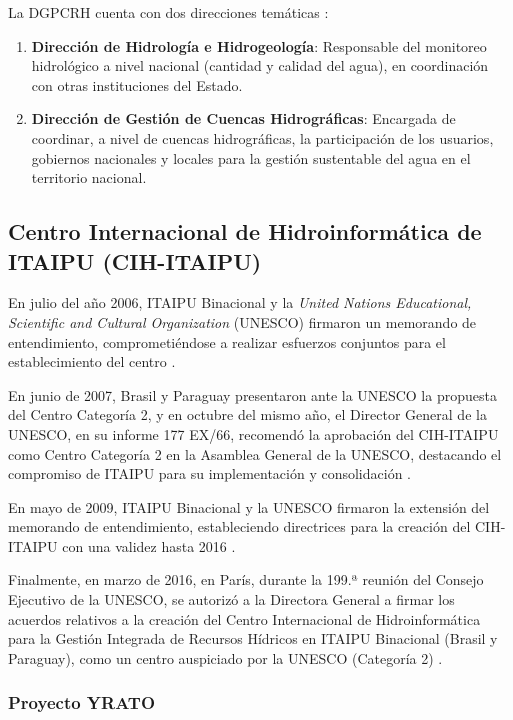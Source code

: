 La DGPCRH cuenta con dos direcciones temáticas \cite{MAD23}:
\begin{enumerate}
    \item \textbf{Dirección de Hidrología e Hidrogeología}: Responsable del monitoreo hidrológico a nivel nacional (cantidad y calidad del agua), en coordinación con otras instituciones del Estado.
    \item \textbf{Dirección de Gestión de Cuencas Hidrográficas}: Encargada de coordinar, a nivel de cuencas hidrográficas, la participación de los usuarios, gobiernos nacionales y locales para la gestión sustentable del agua en el territorio nacional.
\end{enumerate}

\subsection{Centro Internacional de Hidroinformática de ITAIPU (CIH-ITAIPU)}

En julio del año 2006, ITAIPU Binacional y la \textit{United Nations Educational, Scientific and Cultural Organization} (UNESCO) firmaron un memorando de entendimiento, comprometiéndose a realizar esfuerzos conjuntos para el establecimiento del centro \cite{CIH23}.  

En junio de 2007, Brasil y Paraguay presentaron ante la UNESCO la propuesta del Centro Categoría 2, y en octubre del mismo año, el Director General de la UNESCO, en su informe 177 EX/66, recomendó la aprobación del CIH-ITAIPU como Centro Categoría 2 en la Asamblea General de la UNESCO, destacando el compromiso de ITAIPU para su implementación y consolidación \cite{CIH23}.  

En mayo de 2009, ITAIPU Binacional y la UNESCO firmaron la extensión del memorando de entendimiento, estableciendo directrices para la creación del CIH-ITAIPU con una validez hasta 2016 \cite{CIH23}.  

Finalmente, en marzo de 2016, en París, durante la 199.ª reunión del Consejo Ejecutivo de la UNESCO, se autorizó a la Directora General a firmar los acuerdos relativos a la creación del Centro Internacional de Hidroinformática para la Gestión Integrada de Recursos Hídricos en ITAIPU Binacional (Brasil y Paraguay), como un centro auspiciado por la UNESCO (Categoría 2) \cite{CIH23}.  

\subsubsection{Proyecto YRATO}

